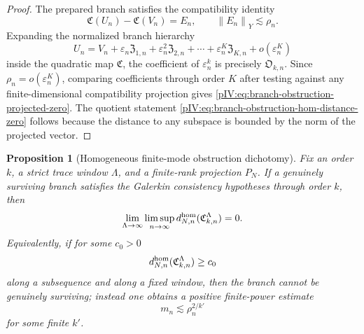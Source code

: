\documentclass[11pt]{article}
\numberwithin{equation}{section}
\theoremstyle{plain}
\newtheorem{proposition}{Proposition}[section]
\theoremstyle{definition}
\theoremstyle{remark}
\newcommand{\eps}{\varepsilon}
\newcommand{\norm}[2]{\left\|#1\right\|_{#2}}
\newcommand{\calC}{\mathfrak C}
\newcommand{\frakZ}{\mathfrak Z}
\newcommand{\Ored}{\mathfrak O}
\begin{document}
\begin{proof}
The prepared branch satisfies the compatibility identity
\begin{equation}\label{pIV:eq:branch-compat-identity-hom}
        \calC(U_n)-\calC(V_n)=E_n,
        \qquad
        \norm{E_n}{Y}\lesssim \rho_n .
\end{equation}
Expanding the normalized branch hierarchy
\[
        U_n
        =V_n+
        \eps_n\frakZ_{1,n}+
        \eps_n^2\frakZ_{2,n}+
        \cdots+
        \eps_n^K\frakZ_{K,n}+o(\eps_n^K)
\]
inside the quadratic map \(\calC\), the coefficient of \(\eps_n^k\) is precisely
\(\Ored_{k,n}\).  Since \(\rho_n=o(\eps_n^K)\), comparing coefficients through order
\(K\) after testing against any finite-dimensional compatibility projection gives
\eqref{pIV:eq:branch-obstruction-projected-zero}.  The quotient statement
\eqref{pIV:eq:branch-obstruction-hom-distance-zero} follows because the distance to any
subspace is bounded by the norm of the projected vector.
\end{proof}

\begin{proposition}[Homogeneous finite-mode obstruction dichotomy]
\label{pIV:prop:homogeneous-obstruction-dichotomy}
Fix an order \(k\), a strict trace window \(\Lambda\), and a finite-rank projection
\(P_N\).  If a genuinely surviving branch satisfies the Galerkin consistency
hypotheses through order \(k\), then
\begin{equation}\label{pIV:eq:hom-obstruction-small}
        \lim_{\Lambda\to\infty}\limsup_{n\to\infty}
        d^{\rm hom}_{N,n}(\calC^\Lambda_{k,n})=0 .
\end{equation}
Equivalently, if for some \(c_0>0\)
\begin{equation}\label{pIV:eq:hom-obstruction-visible}
        d^{\rm hom}_{N,n}(\calC^\Lambda_{k,n})\ge c_0
\end{equation}
along a subsequence and along a fixed window, then the branch cannot be genuinely
surviving; instead one obtains a positive finite-power estimate
\begin{equation}\label{pIV:eq:hom-visible-finite-power}
        m_n\lesssim \rho_n^{2/k'}
\end{equation}
for some finite \(k'\).
\end{proposition}
\end{document}
